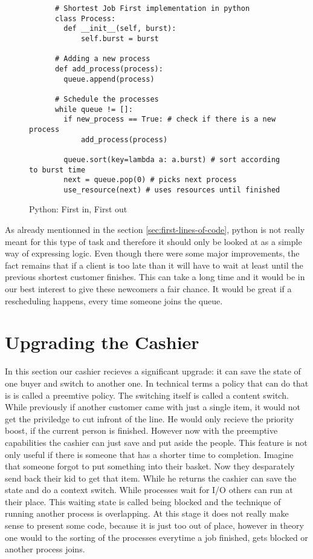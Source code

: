 \begin{figure}[h]
    \begin{verbatim}
      # Shortest Job First implementation in python
      class Process:
        def __init__(self, burst):
            self.burst = burst

      # Adding a new process
      def add_process(process):
        queue.append(process)

      # Schedule the processes
      while queue != []:
        if new_process == True: # check if there is a new process
            add_process(process)
        
        queue.sort(key=lambda a: a.burst) # sort according to burst time
        next = queue.pop(0) # picks next process
        use_resource(next) # uses resources until finished
    \end{verbatim}
    \caption{Python: First in, First out}
    \label{code:sjf}
\end{figure}

As already mentionned in the section \ref{sec:first-lines-of-code}, python is not really meant for this type of task and therefore it should only be looked at as a simple way of expressing logic.
Even though there were some major improvements, the fact remains that if a client is too late than it will have to wait at least  until the previous shortest customer finishes. This can take a long time and it would be in our best interest to give these newcomers a fair chance. 
It would be great if a rescheduling happens, every time someone joins the queue.

\section{Upgrading the Cashier}

In this section our cashier recieves a significant upgrade: it can save the state of one buyer and switch to another one.
In technical terms a policy that can do that is is called a preemtive policy. 
The switching itself is called a content switch.
While previously if another customer came with just a single item, it would not get the priviledge to cut infront of the line. 
He would only recieve the priority boost, if the current person is finished.
However now with the preemptive capabilities the cashier can just save and put aside the people.
This feature is not only useful if there is someone that has a shorter time to completion.
Imagine that someone forgot to put something into their basket.
Now they desparately send back their kid to get that item. While he returns the cashier can save the state and do a context switch.
While processes wait for I/O others can run at their place.
This waiting state is called being blocked and the technique of running another process is overlapping.
At this stage it does not really make sense to present some code, because it is just too out of place, however in theory one would to the sorting of the processes everytime a job finished, gets blocked or another process joins.

